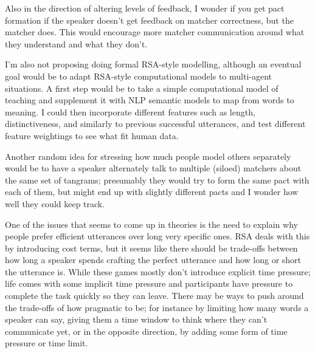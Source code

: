 \documentclass[11pt]{article}
\begin{document}
Also in the direction of altering levels of feedback, I wonder if you get pact formation if the speaker doesn't get feedback on matcher correctness, but the matcher does. This would encourage more matcher communication around what they understand and what they don't. %

I'm also not proposing doing formal RSA-style modelling, although an eventual goal would be to adapt RSA-style computational models to multi-agent situations. A first step would be to take a simple computational model of teaching \cite{frankModelingClassroomTeaching2018} and supplement it with NLP semantic models to map from words to meaning. I could then incorporate different features such as length, distinctiveness, and similarly to previous successful utterances, and test different feature weightings to see what fit human data. 

Another random idea for stressing how much people model others separately would be to have a speaker alternately talk to multiple (siloed) matchers about the same set of tangrams; presumably they would try to form the same pact with each of them, but might end up with slightly different pacts and I wonder how well they could keep track. 

One of the issues that seems to come up in theories is the need to explain why people prefer efficient utterances over long very specific ones. RSA deals with this by introducing cost terms, but it seems like there should be trade-offs between how long a speaker spends crafting the perfect utterance and how long or short the utterance is. While these games mostly don't introduce explicit time pressure; life comes with some implicit time pressure and participants have pressure to complete the task quickly so they can leave. There may be ways to push around the trade-offs of how pragmatic to be; for instance by limiting how many words a speaker can say, giving them a time window to think where they can't communicate yet, or in the opposite direction, by adding some form of time pressure or time limit. 

\end{document}
